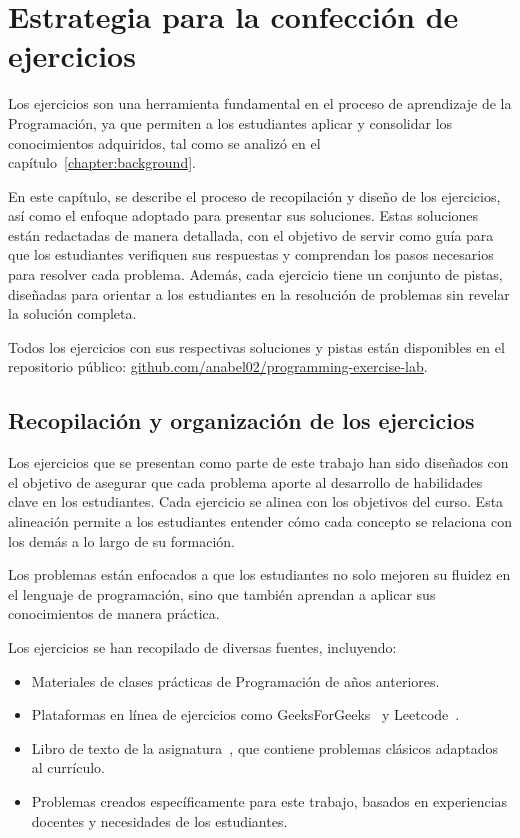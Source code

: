 \chapter{Estrategia para la confección de ejercicios}\label{chapter:exercises}

Los ejercicios son una herramienta fundamental en el proceso de aprendizaje de la Programación, ya que permiten a los estudiantes aplicar y consolidar los conocimientos adquiridos, tal como se analizó en el capítulo~\ref{chapter:background}.

En este capítulo, se describe el proceso de recopilación y diseño de los ejercicios, así como el enfoque adoptado para presentar sus soluciones. Estas soluciones están redactadas de manera detallada, con el objetivo de servir como guía para que los estudiantes verifiquen sus respuestas y comprendan los pasos necesarios para resolver cada problema. Además, cada ejercicio tiene un conjunto de pistas, diseñadas para orientar a los estudiantes en la resolución de problemas sin revelar la solución completa.

Todos los ejercicios con sus respectivas soluciones y pistas están disponibles en el repositorio público: \href{https://github.com/anabel02/programming-exercise-lab}{github.com/anabel02/programming-exercise-lab}.

\section{Recopilación y organización de los ejercicios}\label{sec:exercises}

Los ejercicios que se presentan como parte de este trabajo han sido diseñados con el objetivo de asegurar que cada problema aporte al desarrollo de habilidades clave en los estudiantes. Cada ejercicio se alinea con los objetivos del curso. Esta alineación permite a los estudiantes entender cómo cada concepto se relaciona con los demás a lo largo de su formación.

Los problemas están enfocados a que los estudiantes no solo mejoren su fluidez en el lenguaje de programación, sino que también aprendan a aplicar sus conocimientos de manera práctica.

Los ejercicios se han recopilado de diversas fuentes, incluyendo:
\begin{itemize}
    \item Materiales de clases prácticas de Programación de años anteriores.
    \item Plataformas en línea de ejercicios como GeeksForGeeks~\cite{geeksforgeeks} y Leetcode~\cite{leetcode}.
    \item Libro de texto de la asignatura~\cite{katrib_programar}, que contiene problemas clásicos adaptados al currículo.
    \item Problemas creados específicamente para este trabajo, basados en experiencias docentes y necesidades de los estudiantes.
\end{itemize}

